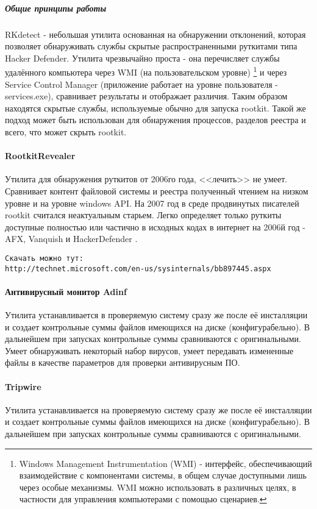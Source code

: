 \subparagraph{Общие принципы работы\\}
RKdetect - небольшая утилита основанная на обнаружении  отклонений,
которая позволяет обнаруживать службы  скрытые распространенными
руткитами типа Hacker Defender. Утилита чрезвычайно проста - она
перечисляет службы  удалённого компьютера через WMI (на пользовательском
уровне) \footnote{Windows Management Instrumentation (WMI) - интерфейс,
 обеспечивающий взаимодействие с компонентами системы, в общем случае
доступными лишь через особые механизмы. WMI можно использовать в
различных целях, в частности для управления компьютерами с помощью
сценариев.} и через Service Control Manager (приложение работает на уровне пользователя - services.exe), сравнивает результаты и отображает различия. Таким образом находятся скрытые
службы, используемые обычно для запуска rootkit. Такой же подход может быть использован
для обнаружения процессов, разделов реестра и всего, что может скрыть rootkit.

\paragraph{RootkitRevealer\\}
Утилита для обнаружения руткитов от 2006го года, <<лечить>> не умеет. Сравнивает контент
 файловой системы и реестра полученный чтением на низком уровне и на уровне windows API.
На 2007 год в среде продвинутых писателей rootkit считался неактуальным старьем. Легко определяет
только руткиты доступные полностью или частично в исходных кодах в интернет на 2006й год - AFX,
Vanquish и HackerDefender .
\begin{verbatim}
Скачать можно тут:
http://technet.microsoft.com/en-us/sysinternals/bb897445.aspx
\end{verbatim}

\paragraph{Антивирусный монитор Adinf\\}
Утилита устанавливается в проверяемую систему сразу же после её
инсталляции и создает контрольные суммы файлов имеющихся на диске
(конфигурабельно). В дальнейшем при запусках  контрольные суммы
сравниваются с оригинальными. Умеет обнаруживать некоторый набор
вирусов, умеет передавать измененные файлы в качестве параметров для
проверки антивирусным ПО.

\paragraph{Tripwire\\}
Утилита устанавливается на проверяемую систему сразу же после её
инсталляции  и создает контрольные суммы файлов имеющихся на диске
(конфигурабельно). В дальнейшем при запусках  контрольные суммы
сравниваются с оригинальными.

